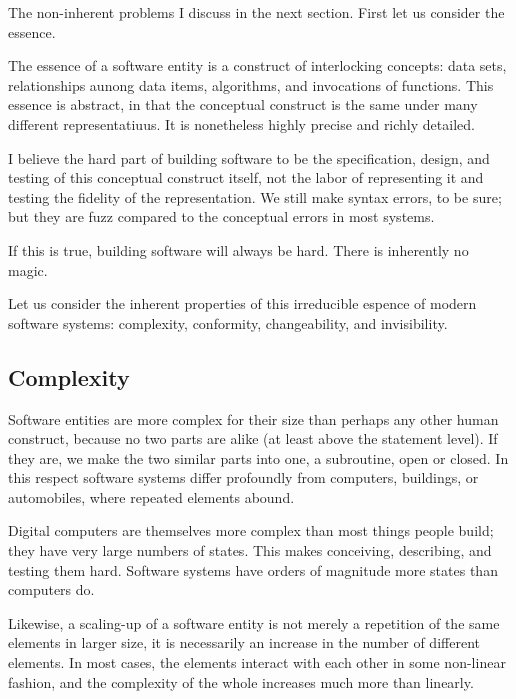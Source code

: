\documentclass[12pt]{article}
\begin{document}
The non-inherent problems I discuss in the next section. First let us consider
the essence.

The essence of a software entity is a construct of interlocking concepts: data
sets, relationships aunong data items, algorithms, and invocations of
functions. This essence is abstract, in that the conceptual construct is the
same under many different representatiuus.  It is nonetheless highly precise
and richly detailed.

I believe the hard part of building software to be the specification, design,
and testing of this conceptual construct itself, not the labor of representing
it and testing the fidelity of the representation. We still make syntax errors,
to be sure; but they are fuzz compared to the conceptual errors in most
systems.

If this is true, building software will always be hard. There is inherently no
magic.

Let us consider the inherent properties of this irreducible espence of modern
software systems: complexity, conformity, changeability, and invisibility.

\subsection*{Complexity}

Software entities are more complex for their size than perhaps any other human
construct, because no two parts are alike (at least above the statement level).
If they are, we make the two similar parts into one, a subroutine, open or
closed. In this respect software systems differ profoundly from computers,
buildings, or automobiles, where repeated elements abound.

Digital computers are themselves more complex than most things people build;
they have very large numbers of states. This makes conceiving, describing, and
testing them hard. Software systems have orders of magnitude more states than
computers do.

Likewise, a scaling-up of a software entity is not merely a repetition of the
same elements in larger size, it is necessarily an increase in the number of
different elements.  In most cases, the elements interact with each other in
some non-linear fashion, and the complexity of the whole increases much more
than linearly.
\end{document}
